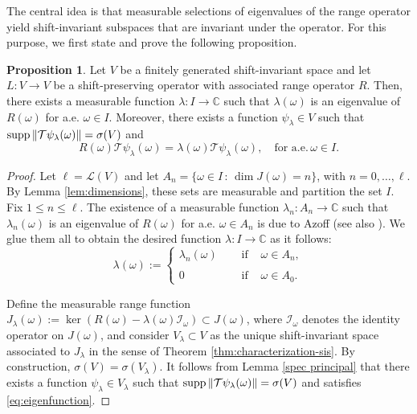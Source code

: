 \documentclass[a4paper,11pt]{amsart}
\theoremstyle{definition}
\newtheorem{pro}[fed]{Proposition}
\theoremstyle{definition}
\def\la{\lambda}
\def\w{\omega}
\def\C{\mathbb{C}}
\newcommand{\supp}{{\rm supp\,}}
\begin{document}
	The central idea is that measurable selections of eigenvalues of the range operator yield shift-invariant subspaces that are invariant under the operator.
	For this purpose, we first state and prove the following proposition.
	
	\begin{pro}\label{An eigenvalue for R}
		Let $V$ be a finitely generated shift-invariant space and let $L:V\rightarrow V$ be a shift-preserving operator with associated range operator $R$. Then, there exists a measurable function $\la: I\to \C$ such that $\la(\w)$ is an eigenvalue of $R(\w)$ for a.e. $\w\in I$. Moreover, there exists a function $\psi_\la \in V$ such that $\supp \| \mathcal T \psi_\la(\w)\| = \sigma(V)$ and
		\begin{equation}\label{eq:eigenfunction}
			R(\w)\mathcal T \psi_\la(\w)=\la(\w) \mathcal T \psi_\la(\w), \quad \text{for a.e.} \, \w \in I.
		\end{equation}	
	\end{pro}
	
	\begin{proof}
		Let $\ell = \mathcal L (V)$ and let $A_n = \{ \w\in  I\,:\, \dim J(\w) = n\}$, with $n=0,\dots,\ell$. By Lemma \ref{lem:dimensions}, these sets are measurable and partition the set $ I$.
		Fix $1\leq n\leq \ell$. The existence of a measurable function $\la_n: A_n\to \C$ such that $\la_n(\w)$ is an eigenvalue of $R(\w)$ for a.e. $\w\in A_n$  is due to Azoff \cite[Corollary 4]{A} (see also \cite[Theorem 5.4]{ACCP}). We glue them all to obtain the desired function $\la: I\to \C$ as it follows:
		$$
		\la(\w):=\left\{ \begin{array}{lcc} \la_n (\w)& \quad \text{ if }  & \w  \in A_n, \\ \\ 0  &  \quad \text{ if } & \w \in A_0. \end{array} \right.
		$$
		
		Define the measurable range function $J_\lambda(\w):= \ker(R(\w)- \lambda(\w)\mathcal{I}_\w) \subset J(\w)$, where $\mathcal I_\w$ denotes the identity operator on $J(\w)$, and consider $V_\la\subset V$ as the unique shift-invariant space associated to $J_\lambda$ in the sense of Theorem \ref{thm:characterization-sis}. By construction, $\sigma(V) = \sigma(V_\la)$.
		It follows from Lemma \ref{spec principal} that there exists a function $\psi_\la\in V_\la$ such that  $\supp \| \mathcal T \psi_\la(\w)\| = \sigma(V)$ and satisfies \eqref{eq:eigenfunction}.
	\end{proof}
	
\end{document}
